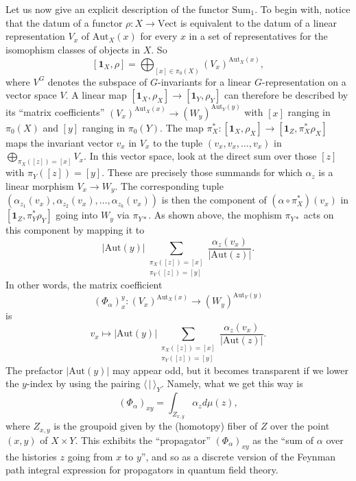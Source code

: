 \documentclass[12pt]{scrartcl}
\theoremstyle{definition}
\numberwithin{equation}{section}
\numberwithin{definition}{section}
\numberwithin{figure}{section}
\begin{document}
Let us now give an explicit description of the functor $\mathrm{Sum}_1$. To begin with, notice that the datum of a functor $\rho\colon X\to \mathrm{Vect}$ is equivalent to the datum of a linear representation $V_x$ of $\mathrm{Aut}_X(x)$ for every $x$ in a set of representatives for the isomophism classes of objects in $X$. So 
\[
[\mathbf{1}_X,\rho]=\bigoplus_{[x]\in \pi_0(X)}(V_x)^{\mathrm{Aut}_X(x)},
\]
where $V^G$ denotes the subspace of $G$-invariants for a linear $G$-representation on a vector space $V$. A linear map $[\mathbf{1}_X,\rho_X]\to [\mathbf{1}_Y,\rho_Y]$ can therefore be described by its ``matrix coefficients'' $ (V_x)^{\mathrm{Aut}_X(x)}\to (W_y)^{\mathrm{Aut}_Y(y)}$ with $[x]$ ranging in $\pi_0(X)$ and $[y]$ ranging in $\pi_0(Y)$. The map
$\pi_X^*\colon [\mathbf{1}_X,\rho_X]\to [\mathbf{1}_Z,\pi_X^*\rho_X]$ maps the invariant vector $v_x$ in $V_x$ to the tuple $(v_x,v_x,\dots,v_x)$ in $\bigoplus_{\pi_X([z])=[x]}V_x$. In this vector space, look at the direct sum over those $[z]$ with $\pi_Y([z])=[y]$. These are precisely those summands for which $\alpha_z$ is a linear morphism $V_x\to W_y$. The corresponding tuple $(\alpha_{z_1}(v_x),\alpha_{z_2}(v_x),\dots, \alpha_{z_k}(v_x))$ is then the component of $(\alpha\circ\pi_X^*)(v_x)$ in $[\mathbf{1}_Z,\pi_Y^*\rho_Y]$ going into $W_y$ via $\pi_{Y*}$. As shown above, the mophism $\pi_{Y*}$ acts on this component by mapping it to
\[
|\mathrm{Aut}(y)|\sum_{\substack{\pi_X([z])=[x]\\ \pi_Y([z])=[y]}} \frac{\alpha_z(v_x)}{|\mathrm{Aut}(z)|} . 
\]
In other words, the matrix coefficient
\[
(\Phi_\alpha)_x^y\colon (V_x)^{\mathrm{Aut}_X(x)}\to (W_y)^{\mathrm{Aut}_Y(y)}
\]
is
\[
v_x\mapsto |\mathrm{Aut}(y)|\sum_{\substack{\pi_X([z])=[x]\\ \pi_Y([z])=[y]}} \frac{\alpha_z(v_x)}{|\mathrm{Aut}(z)|}.
\]
The prefactor $|\mathrm{Aut}(y)|$ may appear odd, but it becomes transparent if we lower the $y$-index by using the pairing $\langle \, |\,\rangle_Y$. Namely, what we get this way is
\[
(\Phi_\alpha)_{xy}=\int_{Z_{x,y}}\alpha_z d\mu(z),
\]
where $Z_{x,y}$ is the groupoid given by the (homotopy) fiber of $Z$ over the point $(x,y)$ of $X\times Y$. This exhibits the ``propagator'' $(\Phi_\alpha)_{xy}$ as the ``sum of $\alpha$ over the histories $z$ going from $x$ to $y$'', and so as a discrete version of the Feynman path integral expression for propagators in quantum field theory.
\end{document}
